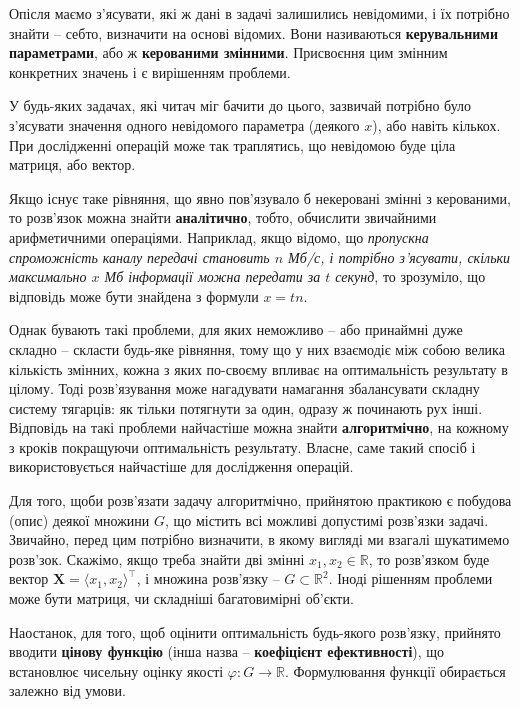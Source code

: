 \documentclass[../book.tex]{subfiles}
\begin{document}
Опісля маємо з'ясувати, які ж дані в задачі залишились невідомими, і їх потрібно знайти -- себто, визначити на основі відомих. Вони називаються \textbf{керувальними параметрами}, або ж \textbf{керованими змінними}. Присвоєння цим змінним конкретних значень і є вирішенням проблеми.

У будь-яких задачах, які читач міг бачити до цього, зазвичай по\-тріб\-но було з'ясувати значення одного невідомого параметра (деякого $x$), або навіть кількох. При дослідженні операцій може так траплятись, що невідомою буде ціла матриця, або вектор.

Якщо існує таке рівняння, що явно пов'язувало б некеровані змінні з керованими, то розв'язок можна знайти \textbf{аналітично}, тобто, обчислити звичайними арифметичними операціями. Наприклад, якщо відомо, що \textit{пропускна спроможність каналу передачі становить $n$ Мб/с, і потрібно з'ясувати, скільки максимально $x$ Мб інформації можна передати за $t$ секунд}, то зрозуміло, що відповідь може бути знайдена з формули ${x=tn}$.

Однак бувають такі проблеми, для яких неможливо -- або принаймні дуже складно -- скласти будь-яке рівняння, тому що у них взаємодіє між собою велика кількість змінних, кожна з яких по-своєму впливає на оптимальність результату в цілому. Тоді розв'язування може нагадувати намагання збалансувати складну систему тягарців: як тільки потягнути за один, одразу ж починають рух інші. Відповідь на такі проблеми найчастіше можна знайти \textbf{алгоритмічно}, на кожному з кроків покращуючи оптимальність результату. Власне, саме такий спосіб і використовується найчастіше для дослідження операцій.

Для того, щоби розв'язати задачу алгоритмічно, прийнятою практикою є побудова (опис) деякої множини $G$, що містить всі можливі допустимі розв'язки задачі. Звичайно, перед цим потрібно визначити, в якому вигляді ми взагалі шукатимемо розв'зок. Скажімо, якщо треба знайти дві змінні $x_1, x_2 \in \mathbb{R}$, то розв'язком буде вектор $\mathbf{X} = {\langle x_1, x_2 \rangle^\top}$, і множина розв'язку -- $G \subset \mathbb{R}^2$. Іноді рішенням проблеми може бути матриця, чи складніші багатовимірні об'єкти.

Наостанок, для того, щоб оцінити оптимальність будь-якого роз\-в'яз\-ку, прийнято вводити \textbf{цінову функцію} (інша назва -- \textbf{коефіцієнт ефективності}), що встановлює чисельну оцінку якості ${\varphi: G \rightarrow \mathbb{R}}$. Формулювання функції обирається залежно від умови.
\end{document}
